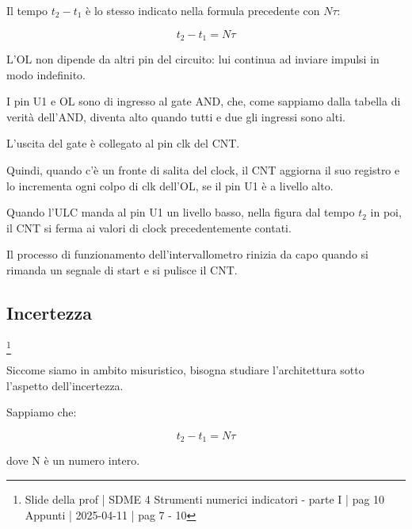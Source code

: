 Il tempo $t_2 - t_1$ è lo stesso indicato nella formula precedente con $N\tau$: 

{
    \Large 
    \begin{equation}
        t_2 - t_1 = N \tau
    \end{equation}
}

L'OL non dipende da altri pin del circuito: lui continua ad inviare impulsi in modo indefinito. \newline 

I pin U1 e OL sono di ingresso al gate AND, che, come sappiamo dalla tabella di verità dell'AND, 
diventa alto quando tutti e due gli ingressi sono alti. \newline 

L'uscita del gate è collegato al pin clk del CNT. \newline 

Quindi, quando c'è un fronte di salita del clock, il CNT aggiorna il suo registro e lo incrementa ogni colpo di clk dell'OL, se il pin U1 è a livello alto. \newline 

Quando l'ULC manda al pin U1 un livello basso, nella figura dal tempo $t_2$ in poi, 
il CNT si ferma ai valori di clock precedentemente contati. \newline 

Il processo di funzionamento dell'intervallometro rinizia da capo quando si rimanda un segnale di start e si pulisce il CNT. \newline 

\newpage 

\subsection{Incertezza}
\footnote{Slide della prof | SDME 4 Strumenti numerici indicatori - parte I | pag 10 \\  
Appunti | 2025-04-11 | pag 7 - 10}

Siccome siamo in ambito misuristico, bisogna studiare l'architettura sotto l'aspetto dell'incertezza. \newline 

Sappiamo che: 

{
    \Large 
    \begin{equation}
        t_2 - t_1 = N \tau
    \end{equation}
} 

dove N è un numero intero. \newline 

